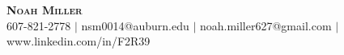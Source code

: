 \begin{center}
    \textbf{\Huge \scshape Noah Miller} \\ \vspace{1pt}
    \small 607-821-2778 $|$ nsm0014@auburn.edu $|$ noah.miller627@gmail.com $|$
    www.linkedin.com/in/F2R39
\end{center}